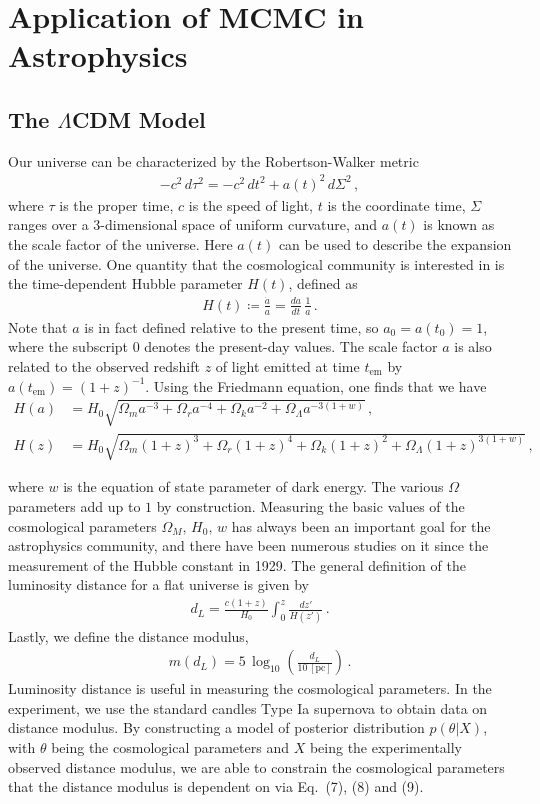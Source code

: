 \documentclass[11pt]{article}
\theoremstyle{break}
\theoremstyle{break}
\begin{document}
\section{Application of MCMC in Astrophysics}
\subsection{The $\Lambda$CDM Model}
${}$\qquad Our universe can be characterized by the Robertson-Walker metric
\begin{align}
-c^2\, d\tau^2 = -c^2 \,dt^2 + a(t)^2\, d\Sigma^2\,,
\end{align}
where $\tau$ is the proper time, $c$ is the speed of light, $t$ is the coordinate time, $\Sigma$ ranges over a 3-dimensional space of uniform curvature, and $a(t)$ is known as the scale factor of the universe. Here $a(t)$ can be used to describe the expansion of the universe. One quantity that the cosmological community is interested in is the time-dependent Hubble parameter $H(t)$, defined as
\begin{align*}
H(t) \coloneqq \frac{\dot{a}}{a} = \frac{da}{dt}\, \frac{1}{a}\,.
\end{align*}
Note that $a$ is in fact defined relative to the present time, so $a_0 = a(t_0) = 1$, where the subscript $0$ denotes the present-day values. The scale factor $a$ is also related to the observed redshift $z$ of light emitted at time $t_{\text{em}}$ by $a(t_{\text{em}}) = (1+z)^{-1}$. Using the Friedmann equation, one finds that we have
\begin{align*}
H(a) &= H_0\sqrt{\Omega_m a^{-3} + \Omega_r a^{-4} + \Omega_k a^{-2} + \Omega_\Lambda a^{-3(1+w)}}\,,\\
H(z) &= H_0\sqrt{\Omega_m (1+z)^{3} + \Omega_r (1+z)^{4} + \Omega_k (1+z)^{2} + \Omega_\Lambda (1+z)^{3(1+w)}}\,, \tag{7}
\end{align*}
\setcounter{equation}{7}

where $w$ is the equation of state parameter of dark energy. The various 
$\Omega$ parameters add up to $1$ by construction. Measuring the basic values of the cosmological parameters $\Omega_M, \, H_0,\, w$ has always been an important goal for the astrophysics community, and there have been numerous studies on it since the measurement of the Hubble constant in 1929. The general definition of the luminosity distance for a flat universe is given by
\begin{align}
d_L= \frac{c(1+z)}{H_0}\int_0^z \frac{dz'}{H(z')}\,.
\end{align}
Lastly, we define the distance modulus,
\begin{align}
m(d_L) = 5\, \log_{10}\left(\frac{d_L}{10\, [\text{pc}]}\right)\,.
\end{align}
${}$\qquad Luminosity distance is useful in measuring the cosmological parameters. In the experiment, we use the standard candles Type Ia supernova to obtain data on distance modulus. By constructing a model of posterior distribution $p(\theta|X)$, with $\theta$ being the cosmological parameters and $X$ being the experimentally observed distance modulus, we are able to constrain the cosmological parameters that the distance modulus is dependent on via Eq.\ (7), (8) and (9).
\end{document}
